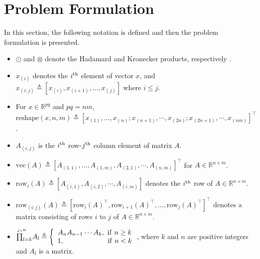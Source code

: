 \documentclass[letterpaper, 10 pt, conference]{ieeeconf}  %
\begin{document}
\section{Problem Formulation}

In this section, the following notation is defined and then the problem formulation is presented.

\begin{itemize}
    \item $\odot$ and $\otimes$ denote the Hadamard and Kronecker products, respectively \cite{BookMatrix}.
    \item $x_{(i)}$ denotes the $i\textsuperscript{th}$ element of vector $x$, and $x_{(i:j)}\triangleq [x_{(i)},x_{(i+1)},\dots,x_{(j)}]$ where $i \le j$.    
    \item For $x\in\mathbb{R}^{pq}$ and $pq=nm$, $\text{reshape}(x, n, m) \triangleq[x_{(1)},\dots,x_{(n)};x_{(n+1)},\cdots,x_{(2n)};x_{(2n+1)},\cdots,x_{(nm)}]^\top$.    
    \item $A_{(i,j)}$ is the $i\textsuperscript{th}$ row-$j\textsuperscript{th}$ column element of matrix $A$.
    \item $\text{vec}(A)\triangleq [A_{(1,1)},\dots,A_{(1,m)},A_{(2,1)},\cdots,A_{(n,m)}]^\top  $ for $A\in\mathbb{R}^{n\times m}$.
    \item $\text{row}_i(A) \triangleq [A_{(i,1)},A_{(i,2)},\cdots,A_{(i,m)}]$ denotes the $i\textsuperscript{th}$ row of $A\in\mathbb{R}^{n\times m}$.
    \item $\text{row}_{(i:j)} (A) \triangleq [\text{row}_i(A)^\top  , \text{row}_{i+1}(A)^\top  ,\dots,\text{row}_{j}(A)^\top  ]^\top  $ denotes a matrix consisting of rows $i$ to $j$ of $A\in\mathbb{R}^{n\times m}$.
    \item $\overset{\curvearrowleft}\prod^{n}_{l=k} A_l \triangleq \left\{ {\begin{array}{*{20}{c}}
{{A_n}{A_{n - 1}} \cdots {A_k},\,\,{\rm{if}}\,\,n \ge k}\\
{1,\,\,\,\,\,\,\,\,\,\,\,\,\,\,\,\,\,\,\,\,\,\,\,\,\,\,\;\;\;\;\;\;\;{\rm{if}}\,\,n < k}
\end{array}} \right.$, where $k$ and $n$ are positive integers and $A_l$ is a matrix.
\end{itemize}
\end{document}

